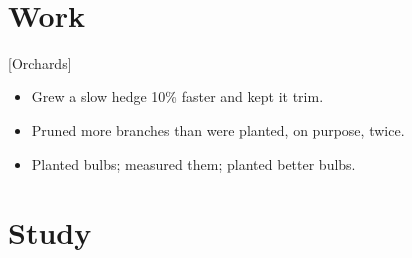 \documentclass[paper=a4, fontsize=11pt]{resume}
\begin{document}
{\sans\bfseries\LARGE {}}\\[close]

\section*{Work}

[Orchards]
\begin{itemize}
  \item Grew a slow hedge 10\% faster and kept it trim.
  \item Pruned more branches than were planted, on purpose, twice.
\end{itemize}

\begin{itemize}
  \item Planted bulbs; measured them; planted better bulbs.
\end{itemize}

\section*{Study}

\end{document}
